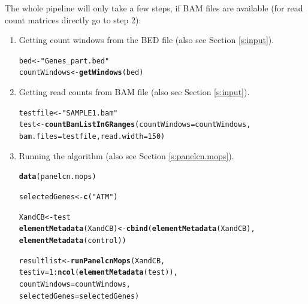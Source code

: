 \documentclass[article]{bioinf}\usepackage[]{graphicx}\usepackage[]{color}
\makeatletter
\newcommand{\hlnum}[1]{\textcolor[rgb]{0.686,0.059,0.569}{#1}}%
\newcommand{\hlstr}[1]{\textcolor[rgb]{0.192,0.494,0.8}{#1}}%
\newcommand{\hlopt}[1]{\textcolor[rgb]{0,0,0}{#1}}%
\newcommand{\hlstd}[1]{\textcolor[rgb]{0.345,0.345,0.345}{#1}}%
\newcommand{\hlkwb}[1]{\textcolor[rgb]{0.69,0.353,0.396}{#1}}%
\newcommand{\hlkwc}[1]{\textcolor[rgb]{0.333,0.667,0.333}{#1}}%
\newcommand{\hlkwd}[1]{\textcolor[rgb]{0.737,0.353,0.396}{\textbf{#1}}}%
\newenvironment{kframe}{%
 \def\at@end@of@kframe{}%
 \ifinner\ifhmode%
  \def\at@end@of@kframe{\end{minipage}}%
  \begin{minipage}{\columnwidth}%
 \fi\fi%
 \def\FrameCommand##1{\hskip\@totalleftmargin \hskip-\fboxsep
 \colorbox{shadecolor}{##1}\hskip-\fboxsep
     \hskip-\linewidth \hskip-\@totalleftmargin \hskip\columnwidth}%
 \MakeFramed {\advance\hsize-\width
   \@totalleftmargin\z@ \linewidth\hsize
   \@setminipage}}%
 {\par\unskip\endMakeFramed%
 \at@end@of@kframe}
\newenvironment{knitrout}{}{} %
\makeatother
\begin{document}
The whole pipeline will only take a few steps, if BAM files are available
(for read count matrices directly go to step 2):

\begin{enumerate}
\item Getting count windows from the BED file (also see Section \ref{s:input}).
\begin{knitrout}
\color{fgcolor}\begin{kframe}
\begin{alltt}
\hlstd{bed} \hlkwb{<-} \hlstr{"Genes_part.bed"}
\hlstd{countWindows} \hlkwb{<-} \hlkwd{getWindows}\hlstd{(bed)}
\end{alltt}
\end{kframe}
\end{knitrout}

\item Getting read counts from BAM file (also see Section \ref{s:input}).
\begin{knitrout}
\color{fgcolor}\begin{kframe}
\begin{alltt}
\hlstd{testfile} \hlkwb{<-} \hlstr{"SAMPLE1.bam"}
\hlstd{test} \hlkwb{<-} \hlkwd{countBamListInGRanges}\hlstd{(}\hlkwc{countWindows} \hlstd{= countWindows,}
                                \hlkwc{bam.files} \hlstd{= testfile,} \hlkwc{read.width} \hlstd{=} \hlnum{150}\hlstd{)}
\end{alltt}
\end{kframe}
\end{knitrout}

\item Running the algorithm (also see Section \ref{s:panelcn.mops}).
\begin{knitrout}
\color{fgcolor}\begin{kframe}
\begin{alltt}
\hlkwd{data}\hlstd{(panelcn.mops)}

\hlstd{selectedGenes} \hlkwb{<-} \hlkwd{c}\hlstd{(}\hlstr{"ATM"}\hlstd{)}

\hlstd{XandCB} \hlkwb{<-} \hlstd{test}
\hlkwd{elementMetadata}\hlstd{(XandCB)} \hlkwb{<-} \hlkwd{cbind}\hlstd{(}\hlkwd{elementMetadata}\hlstd{(XandCB),}
                                \hlkwd{elementMetadata}\hlstd{(control))}

\hlstd{resultlist} \hlkwb{<-} \hlkwd{runPanelcnMops}\hlstd{(XandCB,}
                            \hlkwc{testiv} \hlstd{=} \hlnum{1}\hlopt{:}\hlkwd{ncol}\hlstd{(}\hlkwd{elementMetadata}\hlstd{(test)),}
                            \hlkwc{countWindows} \hlstd{= countWindows,}
                            \hlkwc{selectedGenes} \hlstd{= selectedGenes)}
\end{alltt}
\end{kframe}
\end{knitrout}


\end{enumerate}
\end{document}
